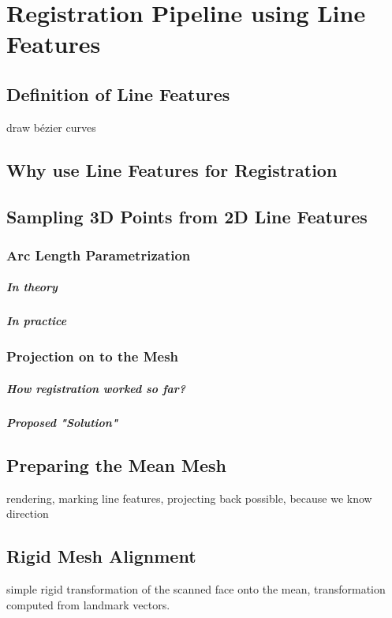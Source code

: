 \chapter{Registration Pipeline using Line Features}

\section{Definition of Line Features}
draw bézier curves
\section{Why use Line Features for Registration}

\section{Sampling 3D Points from 2D Line Features}
\subsection{Arc Length Parametrization}
\paragraph{In theory}

\paragraph{In practice}

\subsection{Projection on to the Mesh}
\paragraph{How registration worked so far?}

\paragraph{Proposed "Solution"}

\section{Preparing the Mean Mesh}
rendering, marking line features, projecting back possible, because we know direction

\section{Rigid Mesh Alignment}
simple rigid transformation of the scanned face onto the mean, transformation computed from landmark vectors.

